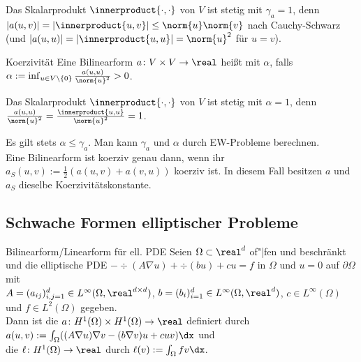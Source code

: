 \begin{Bsp}
    Das Skalarprodukt $\innerproduct{\cdot, \cdot}$ von $V$ ist stetig mit $\gamma_a = 1$, denn
    $|a(u, v)| = |\innerproduct{u, v}| \le \norm{u} \norm{v}$ nach Cauchy-Schwarz
    (und $|a(u, u)| = |\innerproduct{u, u}| = \norm{u}^2$ für $u = v$).
\end{Bsp}

\linie

\begin{Def}{Koerzivität}
    Eine Bilinearform $a\colon V \times V \to \real$ heißt  mit
     $\alpha$, falls
    $\alpha := \inf_{u \in V \setminus \{0\}} \frac{a(u, u)}{\norm{u}^2} > 0$.
\end{Def}

\begin{Bsp}
    Das Skalarprodukt $\innerproduct{\cdot, \cdot}$ von $V$ ist stetig mit $\alpha = 1$, denn
    $\frac{a(u, u)}{\norm{u}^2} = \frac{\innerproduct{u, u}}{\norm{u}^2} = 1$.
\end{Bsp}

\linie

\begin{Bem}
    Es gilt stets $\alpha \le \gamma_a$.
    Man kann $\gamma_a$ und $\alpha$ durch EW-Probleme berechnen.\\
    Eine Bilinearform ist koerziv genau dann, wenn ihr 
    $a_S(u, v) := \frac{1}{2} (a(u, v) + a(v, u))$ koerziv ist.
    In diesem Fall besitzen $a$ und $a_S$ dieselbe Koerzivitätskonstante.
\end{Bem}

\pagebreak

\subsection{%
    Schwache Formen elliptischer Probleme%
}

\begin{Def}{Bilinearform/Linearform für ell. PDE}
    Seien $\Omega \subset \real^d$ of"|fen und beschränkt und die elliptische PDE
    $-\div(A\nabla u) + \div(bu) + cu = f$ in $\Omega$ und
    $u = 0$ auf $\partial\Omega$ mit\\
    $A = (a_{ij})_{i,j=1}^d \in L^\infty(\Omega, \real^{d \times d})$,
    $b = (b_i)_{i=1}^d \in L^\infty(\Omega, \real^d)$,
    $c \in L^\infty(\Omega)$ und
    $f \in L^2(\Omega)$ gegeben.\\
    Dann ist die
     $a\colon H^1(\Omega) \times H^1(\Omega) \to \real$
    definiert durch\\
    $a(u, v) := \int_\Omega ((A\nabla u) \nabla v - (b \nabla v) u + cuv) \dx$ und\\
    die  $\ell\colon H^1(\Omega) \to \real$ durch
    $\ell(v) := \int_\Omega fv \dx$.
\end{Def}

